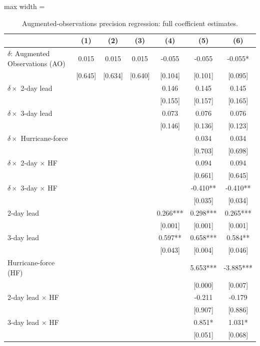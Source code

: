 \begin{table}

\caption{Augmented-observations precision regression: full coefficient estimates. \label{tab:appB_interaction_full}}
\centering
\begin{adjustbox}{max width = \textwidth}
\begin{threeparttable}
\begin{tabular}[t]{lcccccc}
\toprule
  & (1) & (2) & (3) & (4) & (5) & (6)\\
\midrule
$\delta$: Augmented Observations (AO) & 0.015 & 0.015 & 0.015 & -0.055 & -0.055 & -0.055*\\
 & {}[0.645] & {}[0.634] & {}[0.640] & {}[0.104] & {}[0.101] & {}[0.095]\\
$\delta \times$ 2-day lead &  &  &  & 0.146 & 0.145 & 0.145\\
 &  &  &  & {}[0.155] & {}[0.157] & {}[0.165]\\
$\delta \times$ 3-day lead &  &  &  & 0.073 & 0.076 & 0.076\\
 &  &  &  & {}[0.146] & {}[0.136] & {}[0.123]\\
$\delta \times$ Hurricane-force &  &  &  &  & 0.034 & 0.034\\
 &  &  &  &  & {}[0.703] & {}[0.698]\\
$\delta \times$ 2-day $\times$ HF &  &  &  &  & 0.094 & 0.094\\
 &  &  &  &  & {}[0.661] & {}[0.645]\\
$\delta \times$ 3-day $\times$ HF &  &  &  &  & -0.410** & -0.410**\\
 &  &  &  &  & {}[0.035] & {}[0.034]\\
2-day lead &  &  &  & 0.266*** & 0.298*** & 0.265***\\
 &  &  &  & {}[0.001] & {}[0.001] & {}[0.001]\\
3-day lead &  &  &  & 0.597** & 0.658*** & 0.584**\\
 &  &  &  & {}[0.043] & {}[0.004] & {}[0.046]\\
Hurricane-force (HF) &  &  &  &  & 5.653*** & -3.885***\\
 &  &  &  &  & {}[0.000] & {}[0.007]\\
2-day lead $\times$ HF &  &  &  &  & -0.211 & -0.179\\
 &  &  &  &  & {}[0.907] & {}[0.886]\\
3-day lead $\times$ HF &  &  &  &  & 0.851* & 1.031*\\
 &  &  &  &  & {}[0.051] & {}[0.068]\\

\end{tabular}
\end{threeparttable}
\end{adjustbox}
\end{table}
